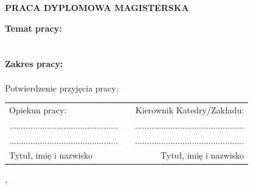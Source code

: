 {  \begin{center}
    \vspace{1cm}
    \Large{\textbf{\uppercase{Praca dyplomowa magisterska}}}
  \end{center}
  \vspace{1cm}
	
		\noindent\textbf{Temat pracy:} \\
		\@title\\
		\\
		\noindent\textbf{Zakres pracy:} \\
		\@descr\\
		
		\vspace{2.5cm}
		\noindent{}Potwierdzenie przyjęcia pracy:
		\vspace{1cm}
		
		\noindent
		\begin{tabularx}{\textwidth}{@{}lp{5cm}r@{}}
			Opiekun pracy: & & Kierownik Katedry/Zakładu: \\ 
			.............................................. & & .............................................. \\
			.............................................. & & .............................................. \\
			Tytuł, imię i nazwisko & & Tytuł, imię i nazwisko \\
		\end{tabularx}
		
		\begin{center}
			\@miasto, \@date
		\end{center}
	
	\pagebreak
	\addtolength{\hoffset}{0.5cm}
	\addtolength{\voffset}{1.5cm}
	\addtolength{\textwidth}{-0.5cm}
}

\makeatother

